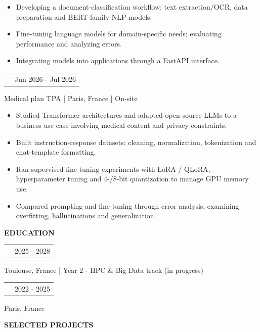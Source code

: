 \documentclass[10pt,a4paper]{extarticle}
\makeatletter
\newcommand{\CPMSURL}{https://www.cpms.fr/}
\newcommand{\cvsection}[1]{%
  \vspace{9pt}
  {\fontsize{10.5}{12.5}\selectfont\bfseries\color{CVAccent}\MakeUppercase{#1}}\par
  \vspace{3pt}{\color{CVGray!35}\hrule height .45pt}\vspace{4pt}}
\newcommand{\cvrole}[3]{%
  \begin{tabularx}{\linewidth}{@{}>{\raggedright\arraybackslash}X r@{}}
  {\bfseries #1} & {\fontsize{9}{11}\selectfont\color{CVGray}#2}
  \end{tabularx}\par
  {\fontsize{9}{11}\selectfont\color{CVGray}#3}\par\vspace{2pt}}
\newenvironment{cvbullets}{%
  \begin{itemize}[leftmargin=12pt,label=\textbullet,topsep=1pt,partopsep=0pt,parsep=0pt,itemsep=1.2pt]
}{\end{itemize}}
\makeatother
\begin{document}
\begin{cvbullets}

  \item Developing a document-classification workflow: text extraction/OCR, data preparation and BERT-family NLP models.

  \item Fine-tuning language models for domain-specific needs; evaluating performance and analyzing errors.

  \item Integrating models into applications through a FastAPI interface.

\end{cvbullets}

\vspace{4pt}

\cvrole{AI / LLM Fine-tuning Intern | \href{\CPMSURL}{CPMS}}{Jun 2026 - Jul 2026}{Medical plan TPA | Paris, France | On-site}

\begin{cvbullets}

  \item Studied Transformer architectures and adapted open-source LLMs to a business use case involving medical content and privacy constraints.

  \item Built instruction-response datasets: cleaning, normalization, tokenization and chat-template formatting.

  \item Ran supervised fine-tuning experiments with LoRA / QLoRA, hyperparameter tuning and 4-/8-bit quantization to manage GPU memory use.

  \item Compared prompting and fine-tuning through error analysis, examining overfitting, hallucinations and generalization.

\end{cvbullets}

\cvsection{EDUCATION}

\cvrole{Engineering Degree in Computer Science | ENSEEIHT - Toulouse INP}{2025 - 2028}{Toulouse, France | Year 2 - HPC \& Big Data track (in progress)}

\vspace{2pt}

\cvrole{Preparatory Classes (CPGE MP2I / MPI) | Lycée Janson-de-Sailly}{2022 - 2025}{Paris, France}

\cvsection{SELECTED PROJECTS}
\end{document}
